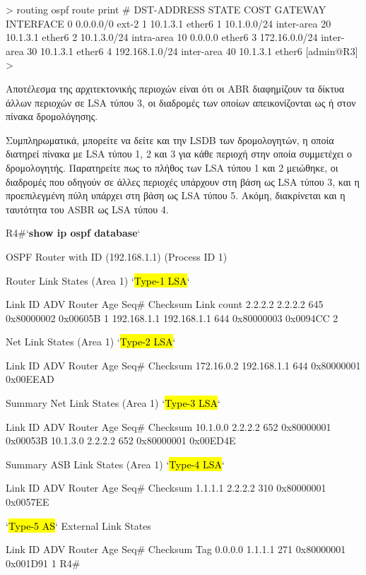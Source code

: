 \documentclass{EdipyLabs} %
\begin{document}
\begin{CommandBox}
[admin@R3] > routing ospf route print
 # DST-ADDRESS        STATE          COST       GATEWAY        INTERFACE
 0 0.0.0.0/0          ext-2          1          10.1.3.1       ether6
 1 10.1.0.0/24        inter-area     20         10.1.3.1       ether6
 2 10.1.3.0/24        intra-area     10         0.0.0.0        ether6
 3 172.16.0.0/24      inter-area     30         10.1.3.1       ether6
 4 192.168.1.0/24     inter-area     40         10.1.3.1       ether6
[admin@R3] >
\end{CommandBox}  

Αποτέλεσμα της αρχιτεκτονικής περιοχών είναι ότι οι ABR διαφημίζουν τα δίκτυα άλλων περιοχών σε LSA τύπου 3, οι διαδρομές των οποίων απεικονίζονται ως  ή  στον πίνακα δρομολόγησης. 

Συμπληρωματικά, μπορείτε να δείτε και την LSDB των δρομολογητών, η οποία διατηρεί πίνακα με LSA τύπου 1, 2 και 3 για κάθε περιοχή στην οποία συμμετέχει ο δρομολογητής. Παρατηρείτε πως το πλήθος των LSA τύπου 1 και 2 μειώθηκε, οι διαδρομές που οδηγούν σε άλλες περιοχές υπάρχουν στη βάση ως LSA τύπου 3, και η προεπιλεγμένη πύλη υπάρχει στη βάση ως LSA τύπου 5. Ακόμη, διακρίνεται και η ταυτότητα του ASBR ως LSA τύπου 4.

\begin{CommandBox}
R4#`\textbf{show ip ospf database}`

            OSPF Router with ID (192.168.1.1) (Process ID 1)

                Router Link States (Area 1)      `\hl{Type-1 LSA}`

Link ID         ADV Router      Age         Seq#       Checksum Link count
2.2.2.2         2.2.2.2         645         0x80000002 0x00605B 1
192.168.1.1     192.168.1.1     644         0x80000003 0x0094CC 2

                Net Link States (Area 1)         `\hl{Type-2 LSA}`

Link ID         ADV Router      Age         Seq#       Checksum
172.16.0.2      192.168.1.1     644         0x80000001 0x00EEAD

                Summary Net Link States (Area 1)   `\hl{Type-3 LSA}`

Link ID         ADV Router      Age         Seq#       Checksum
10.1.0.0        2.2.2.2         652         0x80000001 0x00053B
10.1.3.0        2.2.2.2         652         0x80000001 0x00ED4E

                Summary ASB Link States (Area 1)    `\hl{Type-4 LSA}`

Link ID         ADV Router      Age         Seq#       Checksum
1.1.1.1         2.2.2.2         310         0x80000001 0x0057EE

                `\hl{Type-5 AS}` External Link States

Link ID         ADV Router      Age         Seq#       Checksum Tag
0.0.0.0         1.1.1.1         271         0x80000001 0x001D91 1
R4#
\end{CommandBox}
\end{document}
